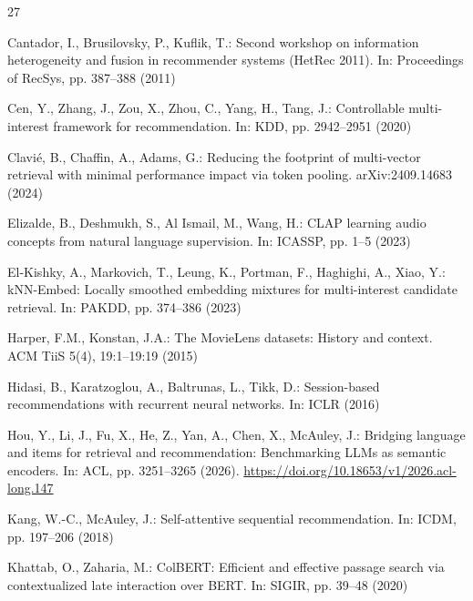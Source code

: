 \documentclass[runningheads]{llncs}
\newif\ifincludeacknowledgements
\begin{document}
\ifincludeacknowledgements

\fi

\clearpage
\begin{thebibliography}{27}
\label{page:references-start}

Cantador, I., Brusilovsky, P., Kuflik, T.:
Second workshop on information heterogeneity and fusion in recommender systems
(HetRec 2011). In: Proceedings of RecSys, pp. 387--388 (2011)

Cen, Y., Zhang, J., Zou, X., Zhou, C., Yang, H., Tang, J.:
Controllable multi-interest framework for recommendation.
In: KDD, pp. 2942--2951 (2020)

Clavi\'e, B., Chaffin, A., Adams, G.:
Reducing the footprint of multi-vector retrieval with minimal performance
impact via token pooling. arXiv:2409.14683 (2024)

Elizalde, B., Deshmukh, S., Al Ismail, M., Wang, H.:
CLAP learning audio concepts from natural language supervision.
In: ICASSP, pp. 1--5 (2023)

El-Kishky, A., Markovich, T., Leung, K., Portman, F., Haghighi, A., Xiao, Y.:
kNN-Embed: Locally smoothed embedding mixtures for multi-interest candidate
retrieval. In: PAKDD, pp. 374--386 (2023)

Harper, F.M., Konstan, J.A.:
The MovieLens datasets: History and context.
ACM TiiS 5(4), 19:1--19:19 (2015)

Hidasi, B., Karatzoglou, A., Baltrunas, L., Tikk, D.:
Session-based recommendations with recurrent neural networks.
In: ICLR (2016)

Hou, Y., Li, J., Fu, X., He, Z., Yan, A., Chen, X., McAuley, J.:
Bridging language and items for retrieval and recommendation: Benchmarking
LLMs as semantic encoders.
In: ACL, pp. 3251--3265 (2026).
\url{https://doi.org/10.18653/v1/2026.acl-long.147}

Kang, W.-C., McAuley, J.:
Self-attentive sequential recommendation.
In: ICDM, pp. 197--206 (2018)

Khattab, O., Zaharia, M.:
ColBERT: Efficient and effective passage search via contextualized late
interaction over BERT. In: SIGIR, pp. 39--48 (2020)


\end{thebibliography}
\end{document}
